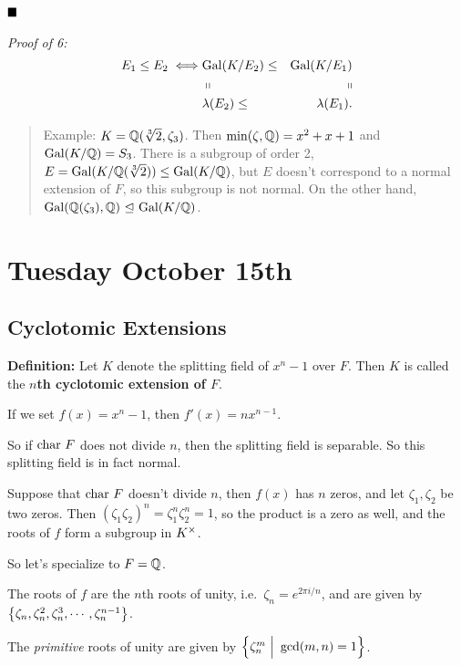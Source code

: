 \(\qed\)

\emph{Proof of 6:} \begin{align*}
E_1 \leq E_2 \iff &\mathrm{Gal}(K/E_2) \leq &\mathrm{Gal}(K/E_1) \\
& \shortparallel &\shortparallel \\
&\lambda(E_2) \leq &\lambda(E_1)
.\end{align*}

\begin{quote}
Example: \(K = {\mathbb{Q}}(\sqrt[3] 2, \zeta_3)\). Then
\(\min(\zeta, {\mathbb{Q}}) = x^2 + x + 1\) and \(\mathrm{Gal}(K/{\mathbb{Q}}) = S_3\). There is a
subgroup of order 2, \(E = \mathrm{Gal}(K/{\mathbb{Q}}(\sqrt[3] 2)) \leq \mathrm{Gal}(K/{\mathbb{Q}})\),
but \(E\) doesn't correspond to a normal extension of \(F\), so this
subgroup is not normal. On the other hand,
\(\mathrm{Gal}({\mathbb{Q}}(\zeta_3), {\mathbb{Q}}) {~\trianglelefteq~} \mathrm{Gal}(K/ {\mathbb{Q}})\).
\end{quote}

\hypertarget{tuesday-october-15th}{%
\section{Tuesday October 15th}\label{tuesday-october-15th}}

\hypertarget{cyclotomic-extensions}{%
\subsection{Cyclotomic Extensions}\label{cyclotomic-extensions}}

\textbf{Definition:} Let \(K\) denote the splitting field of \(x^n-1\)
over \(F\). Then \(K\) is called the \textbf{\(n\)th cyclotomic
extension of \(F\)}.

If we set \(f(x) = x^n-1\), then \(f'(x) = nx^{n-1}\).

So if \(\mathrm{char}~ F\) does not divide \(n\), then the splitting field is
separable. So this splitting field is in fact normal.

Suppose that \(\mathrm{char}~ F\) doesn't divide \(n\), then \(f(x)\) has \(n\)
zeros, and let \(\zeta_1, \zeta_2\) be two zeros. Then
\((\zeta_1 \zeta_2)^n = \zeta_1^n \zeta_2^n = 1\), so the product is a
zero as well, and the roots of \(f\) form a subgroup in \(K^{\times}\).

So let's specialize to \(F = {\mathbb{Q}}\).

The roots of \(f\) are the \(n\)th roots of unity,
i.e.~\(\zeta_n = e^{2\pi i / n}\), and are given by
\(\left\{{\zeta_n, \zeta_n^2, \zeta_n^3, \cdots, \zeta_n^{n-1}}\right\}\).

The \emph{primitive} roots of unity are given by
\(\left\{{\zeta_n^m {~\mathrel{\Big|}~} \gcd(m, n) = 1}\right\}\).

